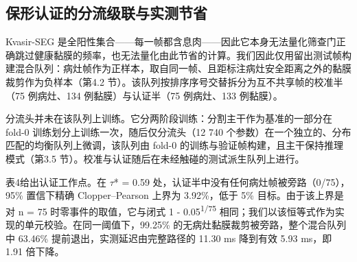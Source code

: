 \documentclass[conference]{IEEEtran}
\begin{document}
\subsection{保形认证的分流级联与实测节省}

Kvasir-SEG 是全阳性集合——每一帧都含息肉——因此它本身无法量化筛查门正确跳过健康黏膜的频率，也无法量化由此节省的计算。我们因此仅用留出测试帧构建混合队列：病灶帧作为正样本，取自同一帧、且距标注病灶安全距离之外的黏膜裁剪作为负样本（第4.2 节）。该队列按排序序号交替拆分为互不共享帧的校准半（75 例病灶、134 例黏膜）与认证半（75 例病灶、133 例黏膜）。

分流头并未在该队列上训练。它分两阶段训练：分割主干作为基准的一部分在 fold-0 训练划分上训练一次，随后仅分流头（12 740 个参数）在一个独立的、分布匹配的均衡队列上微调，该队列由 fold-0 的训练与验证帧构建，且主干保持推理模式（第3.5 节）。校准与认证随后在未经触碰的测试派生队列上进行。

表4给出认证工作点。在 $\tau$* = 0.59 处，认证半中没有任何病灶帧被旁路（0/75），95\% 置信下精确 Clopper–Pearson 上界为 3.92\%，低于 5\% 目标。由于该上界是对 n = 75 时零事件的取值，它与闭式 1 - 0.05\textsuperscript{1/75} 相同；我们以该恒等式作为实现的单元校验。在同一阈值下，99.25\% 的无病灶黏膜裁剪被旁路，整个混合队列中 63.46\% 提前退出，实测延迟由完整路径的 11.30 ms 降到有效 5.93 ms，即 1.91 倍下降。

\begin{table}[t]
\centering

\caption{表4 保形认证的分流工作点。校准半与认证半在帧级互不相交。延迟以单台设备上的 CUDA 事件测量；门开销包含 stem、第一编码阶段、小波分支与分流头。}
\label{tab:triage}
\end{table}
\end{document}
